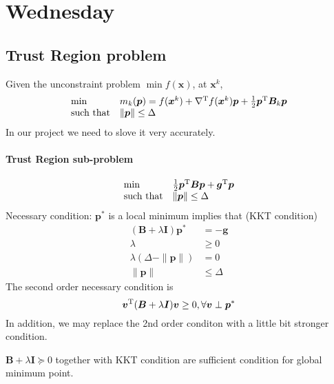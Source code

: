 
\section{Wednesday}
\subsection{Trust Region problem}
Given the unconstraint problem $\min f(\bm x)$, at $\bm x^k$,
\[
\begin{array}{ll}
\min&m_k(\bm p)=f(\bm x^k)+\nabla^{\mathrm T} f(\bm x^k)\bm p+\frac{1}{2}\bm p^{\mathrm T}\bm B_k\bm p\\
\mbox{such that}&\|\bm p\|\le\Delta
\end{array}
\]
In our project we need to slove it very accurately.
\paragraph{Trust Region sub-problem}
\[
\begin{array}{ll}
\min&\frac{1}{2}\bm p^{\mathrm T}\bm B\bm p+\bm g^{\mathrm T}\bm p\\
\mbox{such that}&\|\bm p\|\le\Delta
\end{array}
\]
Necessary condition: $\bm p^*$ is a local minimum implies that (KKT condition)
\begin{subequations}
\begin{align}
(\bm B+\lambda\bm I)\bm p^*&=-\bm g\label{Eq:12:8:a}\\
\lambda&\ge0\\
\lambda(\Delta - \|\bm p\|)&=0\\
\|\bm p\|&\le\Delta
\end{align}
\end{subequations}
The second order necessary condition is
\[
\bm v^{\mathrm T}(\bm B+\lambda\bm I)\bm v\ge0,\forall \bm v\perp\bm p^*
\]
In addition, we may replace the 2nd order conditon with a little bit stronger condition. 
\begin{proposition}
$\bm B+\lambda\bm I\succeq0$ together with KKT condition are sufficient condition for global minimum point.
\end{proposition}
